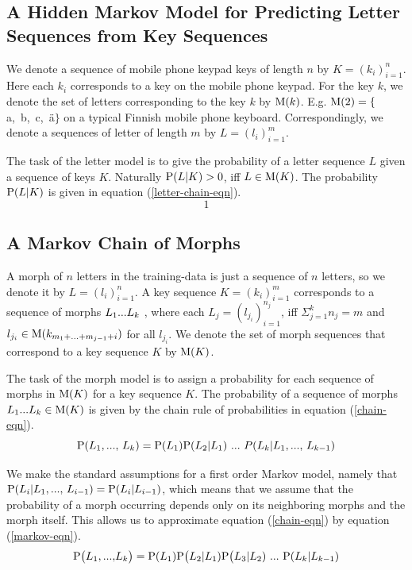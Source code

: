 \documentclass{llncs}
\begin{document}
\subsection{A Hidden Markov Model for Predicting Letter Sequences from Key Sequences}

We denote a sequence of mobile phone keypad keys of length $n$ by $K =
(k_i)_{i=1}^{n}$. Here each $k_i$ corresponds to a key on the mobile
phone keypad. For the key $k$, we denote the set of letters
corresponding to the key $k$ by ${\rm M}(k)$. E.g. ${\rm M}(2) = \{$a,~b,~c,~\"{a}$\}$ on a typical Finnish mobile phone
keyboard. Correspondingly, we denote a sequences of letter of length
$m$ by $L = (l_i)_{i=1}^{m}$.

The task of the letter model is to give the probability of a letter
sequence $L$ given a sequence of keys $K$. Naturally ${\rm P}(L|K) > 0$, iff
$L \in {\rm M}(K)$. The probability ${\rm P}(L|K)$ is given in equation (\ref{letter-chain-eqn}).  
\begin{equation}\label{letter-chain-eqn}
1
\end{equation}

\subsection{A Markov Chain of Morphs}

A morph of $n$ letters in the training-data is just a sequence of $n$
letters, so we denote it by $L = (l_i)_{i=1}^{n}$. A key sequence $K =
(k_i)_{i=1}^{m}$ corresponds to a sequence of morphs $L_1{\rm
  ... }L_k$ , where each $L_j = (l_{j_i})_{i=1}^{n_j}$, iff $\Sigma_{j
  = 1}^{k} n_j = m$ and $l_{j_i} \in {\rm M}(k_{m_1 + {\rm ... } +
  m_{j - 1} + i})$ for all $l_{j_i}$. We denote the set of morph
sequences that correspond to a key sequence $K$ by ${\rm M}(K)$.

The task of the morph model is to assign a probability for each
sequence of morphs in ${\rm M}(K)$ for a key sequence $K$. The
probability of a sequence of morphs $L_1{\rm ... }L_k \in {\rm M}(K)$
is given by the chain rule of probabilities in equation
(\ref{chain-eqn}).
\begin{equation}\label{chain-eqn}
{\rm P}(L_1{\rm, ..., }\ L_k) = {\rm P}(L_1){\rm P}(L_2|L_1)\ {\rm ... }\ P(L_k| L_1{\rm, ..., }\ L_{k - 1})
\end{equation}

We make the standard assumptions for a first order Markov model,
namely that ${\rm P}(L_i | L_1{\rm, ..., }\ L_{i-1}) = {\rm P}(L_i |
L_{i-1})$, which means that we assume that the probability of a morph
occurring depends only on its neighboring morphs and the morph
itself. This allows us to approximate equation (\ref{chain-eqn}) by
equation (\ref{markov-eqn}).
\begin{equation}\label{markov-eqn}
{\rm P}\big(L_1{\rm, ..., }L_k\big) = {\rm P}(L_1){\rm P}\big(L_2 | L_1){\rm P}\big(L_3 | L_2)\ {\rm ... }\ {\rm P}(L_{k} | L_{k-1})
\end{equation}
\end{document}
